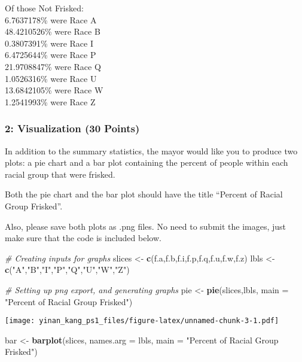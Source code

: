 \documentclass[]{article}
\newenvironment{Shaded}{\begin{snugshade}}{\end{snugshade}}
\newcommand{\CommentTok}[1]{\textcolor[rgb]{0.56,0.35,0.01}{\textit{#1}}}
\newcommand{\DataTypeTok}[1]{\textcolor[rgb]{0.13,0.29,0.53}{#1}}
\newcommand{\KeywordTok}[1]{\textcolor[rgb]{0.13,0.29,0.53}{\textbf{#1}}}
\newcommand{\NormalTok}[1]{#1}
\newcommand{\StringTok}[1]{\textcolor[rgb]{0.31,0.60,0.02}{#1}}
\begin{document}
Of those Not Frisked:\\
6.7637178\% were Race A\\
48.4210526\% were Race B\\
0.3807391\% were Race I\\
6.4725644\% were Race P\\
21.9708847\% were Race Q\\
1.0526316\% were Race U\\
13.6842105\% were Race W\\
1.2541993\% were Race Z

\hypertarget{visualization-30-points}{%
\subsubsection{2: Visualization (30
Points)}\label{visualization-30-points}}

In addition to the summary statistics, the mayor would like you to
produce two plots: a pie chart and a bar plot containing the percent of
people within each racial group that were frisked.

Both the pie chart and the bar plot should have the title ``Percent of
Racial Group Frisked''.

Also, please save both plots as .png files. No need to submit the
images, just make sure that the code is included below.

\begin{Shaded}
\begin{Highlighting}[]
\CommentTok{# Creating inputs for graphs}
\NormalTok{slices <-}\StringTok{ }\KeywordTok{c}\NormalTok{(f.a,f.b,f.i,f.p,f.q,f.u,f.w,f.z)}
\NormalTok{lbls <-}\StringTok{ }\KeywordTok{c}\NormalTok{(}\StringTok{"A"}\NormalTok{,}\StringTok{"B"}\NormalTok{,}\StringTok{"I"}\NormalTok{,}\StringTok{"P"}\NormalTok{,}\StringTok{"Q"}\NormalTok{,}\StringTok{"U"}\NormalTok{,}\StringTok{"W"}\NormalTok{,}\StringTok{"Z"}\NormalTok{)}

\CommentTok{# Setting up png export, and generating graphs}
\NormalTok{pie <-}\StringTok{ }\KeywordTok{pie}\NormalTok{(slices,lbls, }\DataTypeTok{main =} \StringTok{"Percent of Racial Group Frisked"}\NormalTok{)}
\end{Highlighting}
\end{Shaded}

\texttt{[image: yinan\_kang\_ps1\_files/figure-latex/unnamed-chunk-3-1.pdf]}

\begin{Shaded}
\begin{Highlighting}[]
\NormalTok{bar <-}\StringTok{ }\KeywordTok{barplot}\NormalTok{(slices, }\DataTypeTok{names.arg =}\NormalTok{ lbls, }\DataTypeTok{main =} \StringTok{"Percent of Racial Group Frisked"}\NormalTok{)}
\end{Highlighting}
\end{Shaded}
\end{document}
